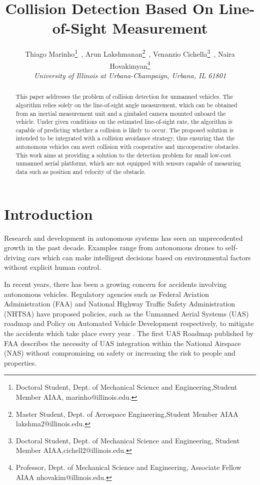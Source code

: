 \documentclass[]{aiaa-tc}%
\title{Collision Detection Based On Line-of-Sight Measurement}
\author{
   Thiago Marinho\thanks{Doctoral Student, Dept. of Mechanical Science and Engineering,Student Member AIAA, marinho@illinois.edu.}~,
   Arun Lakshmanan\thanks{Master Student, Dept. of Aerospace Engineering,Student Member AIAA lakshma2@illinois.edu.}~,
    Venanzio Cichella\thanks{Doctoral Student, Dept. of Mechanical Science and Engineering, Student Member AIAA,cichell2@illinois.edu.}~,
    Naira Hovakimyan\thanks{Professor, Dept. of Mechanical Science and Engineering, Associate Fellow AIAA
    nhovakim@illinois.edu.}\\
    {\normalsize\itshape University of Illinois at Urbana-Champaign, Urbana, IL 61801}
}
\begin{document}
\maketitle

\begin{abstract}

This paper addresses the problem of collision detection for unmanned vehicles. The algorithm relies solely on the line-of-sight angle measurement, which can be obtained from an inertial measurement unit and a gimbaled camera mounted onboard the vehicle. Under given conditions on the estimated line-of-sight rate, the algorithm is capable of predicting whether a collision is likely to occur. The proposed solution is intended to be integrated with a collision avoidance strategy, thus ensuring that the autonomous vehicles can avert collision with cooperative and uncooperative obstacles. This work aims at providing a solution to the detection problem for small low-cost unmanned aerial platforms, which are not equipped with sensors capable of measuring data such as position and velocity of the obstacle.
\end{abstract}



\section{Introduction}
\label{sec:Introduction}
Research and development in autonomous systems  has seen an unprecedented growth in the past decade. Examples range from autonomous drones to self-driving cars which can make intelligent decisions based on environmental factors without explicit human control.

In recent years, there has been a growing concern for accidents involving autonomous vehicles. Regulatory agencies such as Federal Aviation Administration (FAA) and National Highway Traffic Safety Administration (NHTSA) have proposed policies, such as the Unmanned Aerial Systems (UAS) roadmap \cite{FAA_UAS} and Policy on Automated Vehicle Development \cite{autodev2014} respectively, to mitigate the accidents which take place every year \cite{FAAaccd2010}. The first UAS Roadmap published by FAA describes the necessity of UAS integration within the National Airspace (NAS) without compromising on safety or increasing the risk to people and properties.
\end{document}
